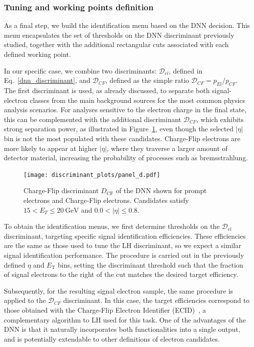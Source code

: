 \subsubsection{Tuning and working points definition}
\label{dnn:tuning}

As a final step, we build the identification menu based on the DNN decision. This menu encapsulates the set of thresholds on the DNN discriminant previously studied, together with the additional rectangular cuts associated with each defined working point.

In our specific case, we combine two discriminants: $\mathcal{D}_{el}$, defined in Eq.~\ref{dnn_discriminant}, and $\mathcal{D}_{CF}$, defined as the simple ratio $\mathcal{D}_{CF} = p_{El}/p_{CF}$. The first discriminant is used, as already discussed, to separate both signal-electron classes from the main background sources for the most common physics analysis scenarios. For analyses sensitive to the electron charge in the final state, this can be complemented with the additional discriminant $\mathcal{D}_{CF}$, which exhibits strong separation power, as illustrated in Figure~\ref{fig:cf_discriminant}, even though the selected $|\eta|$ bin is not the most populated with these candidates. Charge-Flip electrons are more likely to appear at higher $|\eta|$, where they traverse a larger amount of detector material, increasing the probability of processes such as bremsstrahlung.

\begin{figure}[htbp]
  \centering
  \texttt{[image: discriminant\_plots/panel\_d.pdf]}
  \caption{Charge-Flip discriminant $D_{\mathrm{CF}}$ of the DNN shown for prompt electrons and
  Charge-Flip electrons. Candidates satisfy $15<E_{T}\leq 20~\mathrm{GeV}$ and $0.0<|\eta|\leq 0.8$.}
  \label{fig:cf_discriminant}
\end{figure}

To obtain the identification menus, we first determine thresholds on the $\mathcal{D}_{el}$ discriminant, targeting specific signal identification efficiencies. These efficiencies are the same as those used to tune the LH discriminant, so we expect a similar signal identification performance. The procedure is carried out in the previously defined $\eta$ and $E_{\text{T}}$ bins, setting the discriminant threshold such that the fraction of signal electrons to the right of the cut matches the desired target efficiency.

Subsequently, for the resulting signal electron sample, the same procedure is applied to the $\mathcal{D}_{CF}$ discriminant. In this case, the target efficiencies correspond to those obtained with the Charge-Flip Electron Identifier (ECID)~\cite{Aaboud:2657964}, a complementary algorithm to LH used for this task. One of the advantages of the DNN is that it naturally incorporates both functionalities into a single output, and is potentially extendable to other definitions of electron candidates.

